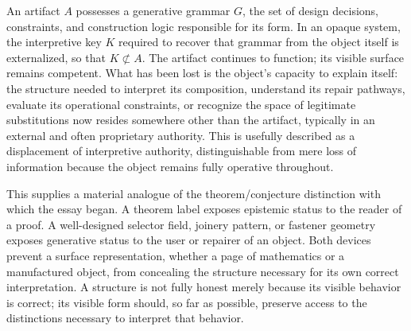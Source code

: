 \documentclass[11pt]{article}
\begin{document}
An artifact $A$ possesses a generative grammar $G$, the set of design decisions, constraints, and construction logic responsible for its form. In an opaque system, the interpretive key $K$ required to recover that grammar from the object itself is externalized, so that $K \not\subset A$. The artifact continues to function; its visible surface remains competent. What has been lost is the object's capacity to explain itself: the structure needed to interpret its composition, understand its repair pathways, evaluate its operational constraints, or recognize the space of legitimate substitutions now resides somewhere other than the artifact, typically in an external and often proprietary authority. This is usefully described as a displacement of interpretive authority, distinguishable from mere loss of information because the object remains fully operative throughout.

This supplies a material analogue of the theorem/conjecture distinction with which the essay began. A theorem label exposes epistemic status to the reader of a proof. A well-designed selector field, joinery pattern, or fastener geometry exposes generative status to the user or repairer of an object. Both devices prevent a surface representation, whether a page of mathematics or a manufactured object, from concealing the structure necessary for its own correct interpretation. A structure is not fully honest merely because its visible behavior is correct; its visible form should, so far as possible, preserve access to the distinctions necessary to interpret that behavior.
\end{document}
